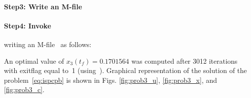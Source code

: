 {\small }

\paragraph{Step3: Write an M-file~}

{\small }

\paragraph{Step4: Invoke~} writing an
M-file~ as follows: 

{\small }

An optimal value of $x_{3}(t_{f})=0.1701564$ was computed after 3012
iterations with exitflag equal to~1 (using~). Graphical
representation of the solution of the problem~\eqref{eq:ispcpb} is
shown in Figs. \ref{fig:prob3_u}, \ref{fig:prob3_x}, and
\ref{fig:prob3_c}.

